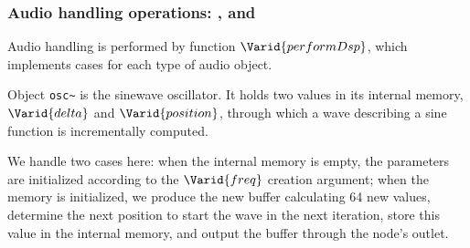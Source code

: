 \subsubsection{Audio handling operations: ,  and }
\label{dsps}
\label{oscdsp}

Audio handling is performed by function \ensuremath{\Varid{performDsp}}, which implements
cases for each type of audio object.

Object \texttt{osc\textasciitilde{}} is the sinewave oscillator. It holds two values in its
internal memory, \ensuremath{\Varid{delta}} and \ensuremath{\Varid{position}}, through which a wave describing a
sine function is incrementally computed.

We handle two cases here: when the internal memory is empty, the parameters
are initialized according to the \ensuremath{\Varid{freq}} creation argument; when the 
memory is initialized, we produce the new buffer calculating
64 new values, determine the next position to start the wave in the next
iteration, store this value in the internal memory, and output the buffer
through the node's outlet.

